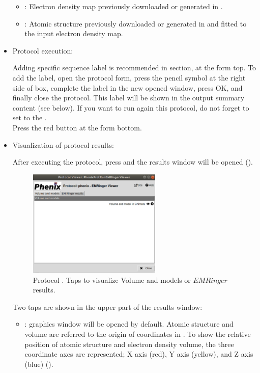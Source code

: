 \begin{itemize}
    \begin{itemize}
     \item {}: Electron density map previously downloaded or generated in \scipion.
     \item {}: Atomic structure previously downloaded or generated in \scipion and fitted to the input electron density map.
    \end{itemize}
    
 \item Protocol execution:

  Adding specific sequence label is recommended in  section, at the form top. To add the label, open the protocol form, press the pencil symbol at the right side of  box, complete the label in the new opened window, press OK, and finally close the protocol. This label will be shown in the output summary content (see below). If you want to run again this protocol, do not forget to set to  the .\\
  Press the  red button at the form bottom.
  
 \item Visualization of protocol results:
  
  After executing the protocol, press  and the results window will be opened (). 
  
  \begin{figure}[H]
     \centering 
     \captionsetup{width=.7\linewidth} 
     \includegraphics[width=0.60\textwidth]{Images_appendix/Fig140.pdf}
     \caption{Protocol . Taps to visualize Volume and models or $EMRinger$ results.}
     \label{fig:app_protocol_emringer_2}
    \end{figure}
    
   Two taps are shown in the upper part of the results window:
    \begin{itemize}
     \item {}: \chimera graphics window will be opened by default. Atomic structure and volume are referred to the origin of coordinates in \chimera. To show the relative position of atomic structure and electron density volume, the three coordinate axes are represented; X axis (red), Y axis (yellow), and Z axis (blue) ().


\end{itemize}
\end{itemize}
